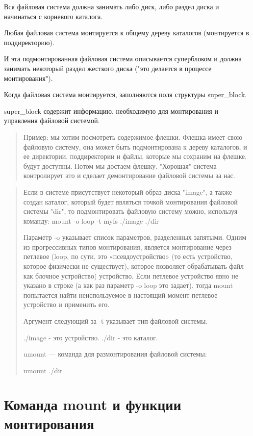 Вся файловая система должна занимать либо диск, либо раздел диска и начинаться с корневого каталога.

Любая файловая система монтируется к общему дереву каталогов (монтируется в поддиректорию).

И эта подмонтированная файловая система описывается суперблоком и должна занимать некоторый раздел жесткого диска ("это делается в процессе монтирования").

Когда файловая система монтируется, заполняются поля структуры super\_block.

super\_block содержит информацию, необходимую для монтирования и управления файловой системой.

\begin{quote}
Пример: мы хотим посмотреть содержимое флешки. Флешка имеет свою файловую систему, она может быть подмонтирована к дереву каталогов, и ее директории, поддиректории и файлы, которые мы сохраним на флешке, будут доступны. Потом мы достаем флешку. "Хорошая" система контролирует это и сделает демонтирование файловой системы за нас.
\end{quote}

\begin{quote}
Если в системе присутствует некоторый образ диска "image", а также создан каталог, который будет являться точкой монтирования файловой системы "dir", то подмонтировать файловую систему можно, используя команду: mount -o loop -t myfs ./image ./dir

Параметр -o указывает список параметров, разделенных запятыми. Одним из прогрессивных типов монтирования, является монтирование через петлевое (loop, по сути, это «псевдоустройство» (то есть устройство, которое физически не существует), которое позволяет обрабатывать файл как блочное устройство) устройство. Если петлевое устройство явно не указано в строке (а как раз параметр -o loop это задает), тогда mount попытается найти неиспользуемое в настоящий момент петлевое устройство и применить его.

Аргумент следующий за -t указывает тип файловой системы.

./image - это устройство. ./dir - это каталог.

umount — команда для размонтирования файловой системы:

umount ./dir
\end{quote}

\section{Команда mount и функции монтирования}

